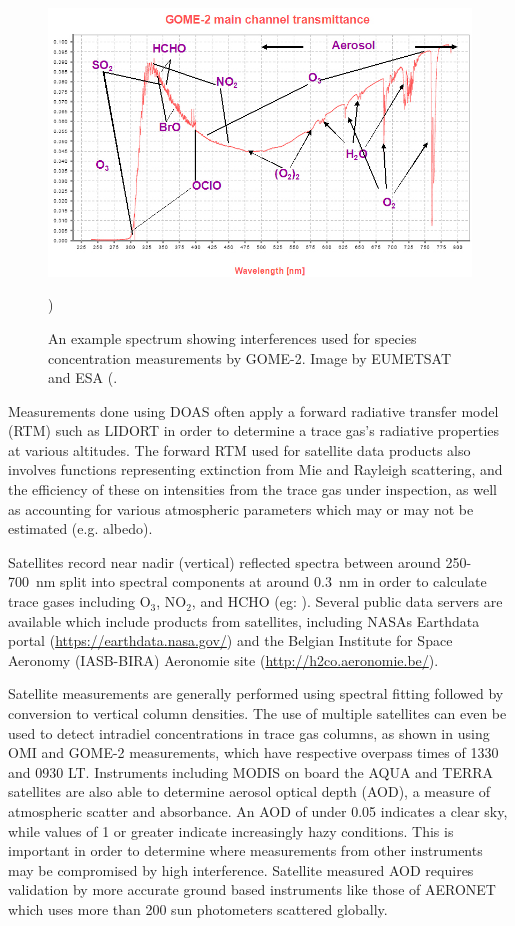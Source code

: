     \begin{figure}
      \includegraphics[width=\textwidth]{Figures/GOME_SPECTRUM.jpg}
      \caption{An example spectrum showing interferences used for species concentration measurements by GOME-2. Image by EUMETSAT and ESA (\cite{GOME2Image}.})
      \label{LR:HCHO:Sat:fig_GOME_products}
    \end{figure}
    
    Measurements done using DOAS often apply a forward radiative transfer model (RTM) such as LIDORT in order to determine a trace gas's radiative properties at various altitudes.
    The forward RTM used for satellite data products also involves functions representing extinction from Mie and Rayleigh scattering, and the efficiency of these on intensities from the trace gas under inspection, as well as accounting for various atmospheric parameters which may or may not be estimated (e.g. albedo).
    
    Satellites record near nadir (vertical) reflected spectra between around 250-700~nm split into spectral components at around $0.3$~nm in order to calculate trace gases including O$_3$, NO$_2$, and HCHO (eg: \cite{Leue2001}).
    Several public data servers are available which include products from satellites, including NASAs Earthdata portal (\url{https://earthdata.nasa.gov/}) and the Belgian Institute for Space Aeronomy (IASB-BIRA) Aeronomie site (\url{http://h2co.aeronomie.be/}).
    
    Satellite measurements are generally performed using spectral fitting followed by conversion to vertical column densities.
    The use of multiple satellites can even be used to detect intradiel concentrations in trace gas columns, as shown in \cite{Stavrakou2015} using OMI and GOME-2 measurements, which have respective overpass times of 1330 and 0930 LT.
    Instruments including MODIS on board the AQUA and TERRA satellites are also able to determine aerosol optical depth (AOD), a measure of atmospheric scatter and absorbance. 
    An AOD of under 0.05 indicates a clear sky, while values of 1 or greater indicate increasingly hazy conditions.
    This is important in order to determine where measurements from other instruments may be compromised by high interference.
    Satellite measured AOD requires validation by more accurate ground based instruments like those of AERONET which uses more than 200 sun photometers scattered globally.
    
